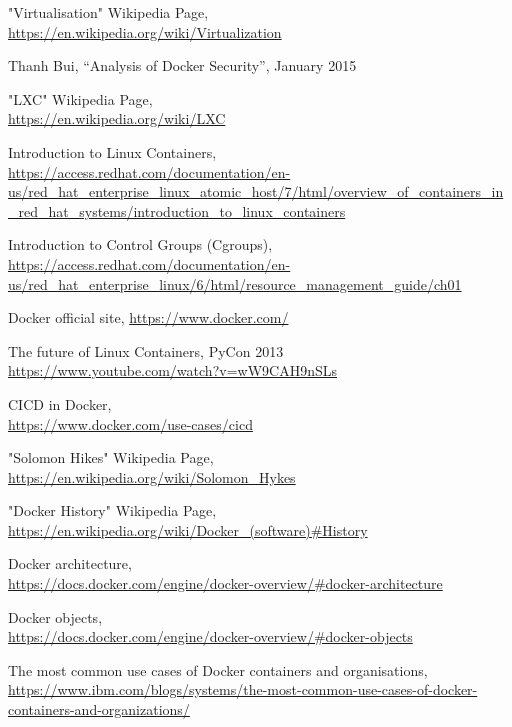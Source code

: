 \documentclass[a4paper,12pt]{article}
\begin{document}
\begin{thebibliography}{99}

"Virtualisation" Wikipedia Page,\\ \url{https://en.wikipedia.org/wiki/Virtualization}

Thanh Bui,
``Analysis of Docker Security'',
January 2015

"LXC" Wikipedia Page,\\ \url{https://en.wikipedia.org/wiki/LXC}

Introduction to Linux Containers,\\ \url{https://access.redhat.com/documentation/en-us/red_hat_enterprise_linux_atomic_host/7/html/overview_of_containers_in_red_hat_systems/introduction_to_linux_containers}
  
Introduction to Control Groups (Cgroups),\\ \url{https://access.redhat.com/documentation/en-us/red_hat_enterprise_linux/6/html/resource_management_guide/ch01}

Docker official site, \url{https://www.docker.com/}

The future of Linux Containers, PyCon 2013\\ \url{https://www.youtube.com/watch?v=wW9CAH9nSLs}

CI\/CD in Docker,\\ \url{https://www.docker.com/use-cases/cicd}

"Solomon Hikes" Wikipedia Page,\\ \url{https://en.wikipedia.org/wiki/Solomon_Hykes}

"Docker History" Wikipedia Page,\\ \url{https://en.wikipedia.org/wiki/Docker_(software)#History}

Docker architecture,\\ \url{https://docs.docker.com/engine/docker-overview/#docker-architecture}

Docker objects,\\ \url{https://docs.docker.com/engine/docker-overview/#docker-objects}

The most common use cases of Docker containers and organisations, \\ \url{https://www.ibm.com/blogs/systems/the-most-common-use-cases-of-docker-containers-and-organizations/}


\end{thebibliography}
\end{document}
